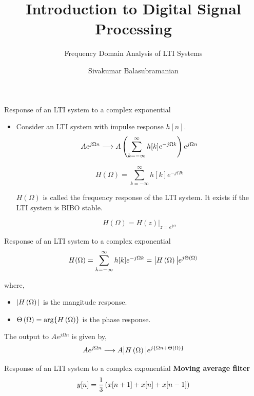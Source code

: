 \documentclass[aspectratio=169]{beamer}
\title{Introduction to Digital Signal Processing}
\subtitle{Frequency Domain Analysis of LTI Systems}
\author{Sivakumar Balasubramanian}
\institute[Christian Medical College] %
{
  \inst{}%
  Department of Bioengineering\\
  Christian Medical College, Bagayam\\
  Vellore 632002
}
\date{}
\let\olditem\item
\renewcommand{\item}{\setlength{\itemsep}{\fill}\olditem}
\def\lp{\ensuremath\left(}
\def\rp{\ensuremath\right)}
\begin{document}
\begin{frame}
  \titlepage
\end{frame}


\begin{frame}[t]{Response of an LTI system to a complex exponential}
\begin{itemize}
  \item Consider an LTI system with impulse response $h[n]$.
  \[  A e^{j\Omega n}  \longrightarrow A \lp \sum_{k=-\infty}^{\infty} h[k]e^{-j\Omega k} \rp e^{j\Omega n} \]

  
  \[ H(\Omega) = \sum_{k=-\infty}^{\infty} h[k]e^{-j\Omega k} \]

  $H( \Omega )$ is called the frequency response of the LTI system. It exists if the LTI system is BIBO stable.

  \[ H(\Omega) = H(z) \bigg \vert_{z = e^{j\Omega}} \]
\end{itemize}
\end{frame}


\begin{frame}[t]{Response of an LTI system to a complex exponential}
\[ H(\Omega) = \sum_{k=-\infty}^{\infty} h[k]e^{-j\Omega k} = \big \vert H\lp \Omega \rp \big \vert e^{j \Theta\lp \Omega \rp}  \]

where, 
\begin{itemize}
  \item $\vert H\lp \Omega \rp \vert$ is the mangitude response.
  \item $\Theta\lp \Omega \rp = \arg \{ H\lp \Omega \rp \}$ is the phase response.
\end{itemize}
\vspace{1cm}

The output to $A e^{j\Omega n}$ is given by,
\[ A e^{j \Omega n} \longrightarrow A \big \vert H \lp \Omega \rp\big \vert e^{j \{ \Omega n + \Theta\lp \Omega\rp\}} \]

\end{frame}


\begin{frame}[t]{Response of an LTI system to a complex exponential}
\textbf{Moving average filter}
\[ y[n] = \frac{1}{3} \lp x[n+1] + x[n] + x[n-1] \rp \]

\end{frame}
\end{document}
